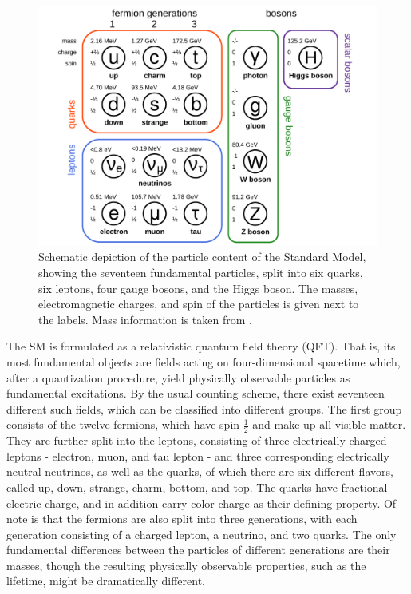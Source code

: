 \begin{figure}[ht]
    \centering
    \includegraphics[width=0.9 \textwidth]{figures/smsketch_colors.pdf}
    \caption{Schematic depiction of the particle content of the Standard Model, showing the seventeen fundamental particles, split into six quarks, six leptons, four gauge bosons, and the Higgs boson. The masses, electromagnetic charges, and spin of the particles is given next to the labels. Mass information is taken from .}
    \label{fig:theory:sm}
\end{figure}

The SM is formulated as a relativistic quantum field theory (QFT). That is, its most fundamental objects are fields acting on four-dimensional spacetime which, after a quantization procedure, yield physically observable particles as fundamental excitations. By the usual counting scheme, there exist seventeen different such fields, which can be classified into different groups. The first group consists of the twelve fermions, which have spin $\frac{1}{2}$ and make up all visible matter. They are further split into the leptons, consisting of three electrically charged leptons - electron, muon, and tau lepton - and three corresponding electrically neutral neutrinos, as well as the quarks, of which there are six different flavors, called up, down, strange, charm, bottom, and top. The quarks have fractional electric charge, and in addition carry color charge as their defining property. Of note is that the fermions are also split into three generations, with each generation consisting of a charged lepton, a neutrino, and two quarks. The only fundamental differences between the particles of different generations are their masses, though the resulting physically observable properties, such as the lifetime, might be dramatically different.

